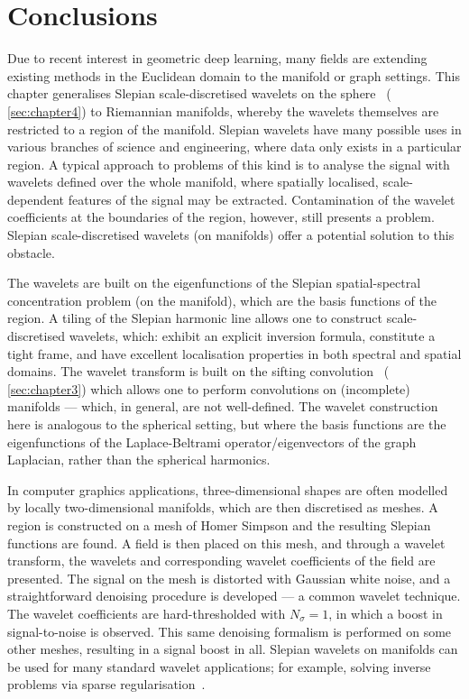 





\section{Conclusions}\label{sec:chapter5_conclusions}

Due to recent interest in geometric deep learning, many fields are extending existing methods in the Euclidean domain to the manifold or graph settings.
This chapter generalises Slepian scale-discretised wavelets on the sphere~\cite{Roddy2022} (\cf{} \cref{sec:chapter4}) to Riemannian manifolds, whereby the wavelets themselves are restricted to a region of the manifold.
Slepian wavelets have many possible uses in various branches of science and engineering, where data only exists in a particular region.
A typical approach to problems of this kind is to analyse the signal with wavelets defined over the whole manifold, where spatially localised, scale-dependent features of the signal may be extracted.
Contamination of the wavelet coefficients at the boundaries of the region, however, still presents a problem.
Slepian scale-discretised wavelets (on manifolds) offer a potential solution to this obstacle.

The wavelets are built on the eigenfunctions of the Slepian spatial-spectral concentration problem (on the manifold), which are the basis functions of the region.
A tiling of the Slepian harmonic line allows one to construct scale-discretised wavelets, which: exhibit an explicit inversion formula, constitute a tight frame, and have excellent localisation properties in both spectral and spatial domains.
The wavelet transform is built on the sifting convolution~\cite{Roddy2021} (\cf{} \cref{sec:chapter3}) which allows one to perform convolutions on (incomplete) manifolds --- which, in general, are not well-defined.
The wavelet construction here is analogous to the spherical setting, but where the basis functions are the eigenfunctions of the Laplace-Beltrami operator/eigenvectors of the graph Laplacian, rather than the spherical harmonics.

In computer graphics applications, three-dimensional shapes are often modelled by locally two-dimensional manifolds, which are then discretised as meshes.
A region is constructed on a mesh of Homer Simpson and the resulting Slepian functions are found.
A field is then placed on this mesh, and through a wavelet transform, the wavelets and corresponding wavelet coefficients of the field are presented.
The signal on the mesh is distorted with Gaussian white noise, and a straightforward denoising procedure is developed --- a common wavelet technique.
The wavelet coefficients are hard-thresholded with \(N_{\sigma}=1\), in which a boost in signal-to-noise is observed.
This same denoising formalism is performed on some other meshes, resulting in a signal boost in all.
Slepian wavelets on manifolds can be used for many standard wavelet applications; for example, solving inverse problems via sparse regularisation~\cite{McEwen2013a,Wallis2017,Price2021}.
